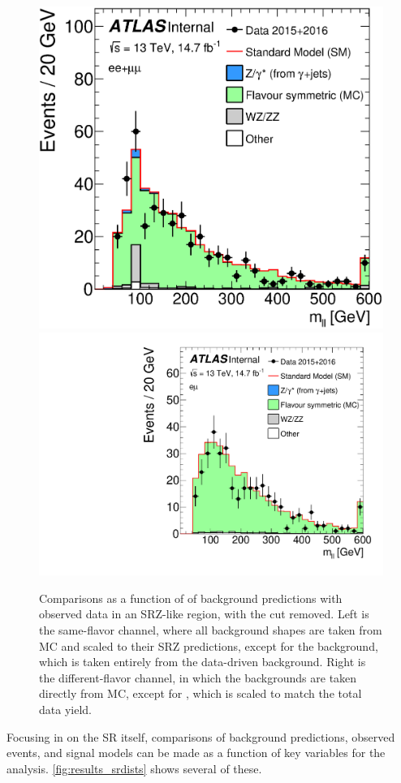 \begin{centering}
\begin{figure}[!hbt]
\myfloatalign
\includegraphics[width=.48\linewidth]{figures/results/mll_SF_R_a_SCALED.eps}
\includegraphics[width=.48\linewidth]{figures/results/mll_DF_R_a_SCALED.pdf}
\caption{Comparisons as a function of \mll of background predictions with observed data in an SRZ-like region, with the \mll cut removed. Left is the same-flavor channel, where all background shapes are taken from \ac{MC} and scaled to their SRZ predictions, except for the \dyjets background, which is taken entirely from the data-driven background. Right is the different-flavor channel, in which the backgrounds are taken directly from \ac{MC}, except for \ttbar, which is scaled to match the total data yield. }
\label{fig:results_widemll}
\end{figure}
\end{centering}

Focusing in on the \ac{SR} itself, comparisons of background predictions, observed events, and signal models can be made as a function of key variables for the analysis. \autoref{fig:results_srdists} shows several of these. 

